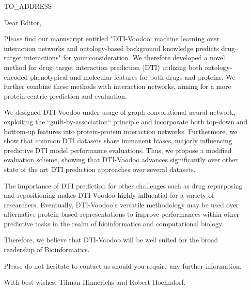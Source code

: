 \documentclass[]{letter}
\begin{document}

\begin{letter}{TO\_ADDRESS}
\address{ADDRESS}


Dear Editor,

Please find our manuscript entitled "DTI-Voodoo: machine learning over interaction networks and
ontology-based background knowledge predicts drug--target
interactions" for your consideration. We therefore developed a novel method for drug--target interaction prediction (DTI) utilizing both ontology-encoded phenotypical and molecular features for both drugs and proteins. We further combine these methods with interaction networks, aiming for a more protein-centric prediction and evaluation. 

We designed DTI-Voodoo under usage of graph convolutional neural network, exploiting the ``guilt-by-association`` principle and incorporate both top-down and bottom-up features into protein-protein interaction networks. Furthermore, we show that common DTI datasets share immanent biases, majorly influencing predictive DTI model performance evaluations. Thus, we propose a modified evaluation scheme, showing that DTI-Voodoo advances significantly over other state of the art DTI prediction approaches over several datasets.

The importance of DTI prediction for other challenges such as drug repurposing and repositioning makes DTI-Voodoo highly influential for a variety of researchers. Eventually, DTI-Voodoo's versatile methodology may be used over alternative protein-based representations to improve performances within other predictive tasks in the realm of bioinformatics and computational biology. 

Therefore, we believe that
DTI-Voodoo will be well suited for the broad readership of
Bioinformatics.

Please do not hesitate to contact us should you require any further
information.

With best wishes,
Tilman Hinnerichs and Robert Hoehndorf.\\


\signature{}



\end{letter}
\end{document}
